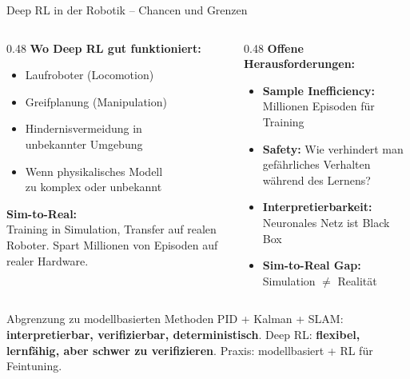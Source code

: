 \documentclass[%
  aspectratio=169,
  10pt
]{beamer}
\newcommand{\warn}[1]{{\color{blackberry}\textbf{#1}}}
\begin{document}
\begin{frame}{Deep RL in der Robotik -- Chancen und Grenzen}

\begin{columns}[T]
  \begin{column}{0.48\textwidth}
    \textbf{Wo Deep RL gut funktioniert:}
    \begin{itemize}
      \item Laufroboter (Locomotion)
      \item Greifplanung (Manipulation)
      \item Hindernisvermeidung in\\
            unbekannter Umgebung
      \item Wenn physikalisches Modell\\
            zu komplex oder unbekannt
    \end{itemize}

    \vspace{2mm}
    \textbf{Sim-to-Real:}\\
    Training in Simulation, Transfer auf realen Roboter.
    Spart Millionen von Episoden auf realer Hardware.
  \end{column}
  \begin{column}{0.48\textwidth}
    \textbf{Offene Herausforderungen:}
    \begin{itemize}
      \item \warn{Sample Inefficiency:}
            Millionen Episoden für Training
      \item \warn{Safety:}
            Wie verhindert man gefährliches Verhalten während des Lernens?
      \item \warn{Interpretierbarkeit:}
            Neuronales Netz ist Black Box
      \item \warn{Sim-to-Real Gap:}
            Simulation $\neq$ Realität
    \end{itemize}
  \end{column}
\end{columns}

\vspace{1mm}
\begin{block}{Abgrenzung zu modellbasierten Methoden}
  \vspace{-1mm}
  PID + Kalman + SLAM: \textbf{interpretierbar, verifizierbar, deterministisch}.
  Deep RL: \textbf{flexibel, lernfähig, aber schwer zu verifizieren}.
  Praxis: modellbasiert + RL für Feintuning.\vspace{-1mm}
\end{block}

\end{frame}


\end{document}
